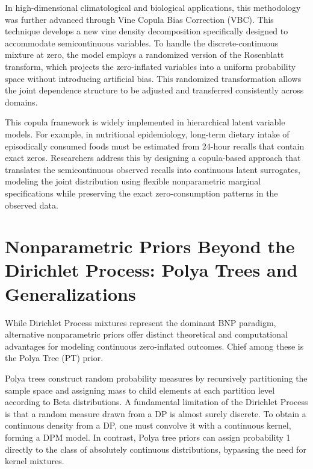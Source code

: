 \documentclass[11pt, a4paper]{article}
\begin{document}
In high-dimensional climatological and biological applications, this methodology was further advanced through Vine Copula Bias Correction (VBC).\cite{schepsmeier2016} This technique develops a new vine density decomposition specifically designed to accommodate semicontinuous variables.\cite{schepsmeier2016} To handle the discrete-continuous mixture at zero, the model employs a randomized version of the Rosenblatt transform, which projects the zero-inflated variables into a uniform probability space without introducing artificial bias.\cite{schepsmeier2016} This randomized transformation allows the joint dependence structure to be adjusted and transferred consistently across domains.\cite{schepsmeier2016}

This copula framework is widely implemented in hierarchical latent variable models.\cite{tooze2006} For example, in nutritional epidemiology, long-term dietary intake of episodically consumed foods must be estimated from 24-hour recalls that contain exact zeros.\cite{tooze2006} Researchers address this by designing a copula-based approach that translates the semicontinuous observed recalls into continuous latent surrogates, modeling the joint distribution using flexible nonparametric marginal specifications while preserving the exact zero-consumption patterns in the observed data.\cite{tooze2006}


\section{Nonparametric Priors Beyond the Dirichlet Process: Polya Trees and Generalizations}

While Dirichlet Process mixtures represent the dominant BNP paradigm, alternative nonparametric priors offer distinct theoretical and computational advantages for modeling continuous zero-inflated outcomes.\cite{miller2018, barrientos2012, lavine1992} Chief among these is the Polya Tree (PT) prior.\cite{lavine1992} 

Polya trees construct random probability measures by recursively partitioning the sample space and assigning mass to child elements at each partition level according to Beta distributions.\cite{lavine1992} A fundamental limitation of the Dirichlet Process is that a random measure drawn from a DP is almost surely discrete.\cite{lavine1992} To obtain a continuous density from a DP, one must convolve it with a continuous kernel, forming a DPM model.\cite{lavine1992} In contrast, Polya tree priors can assign probability 1 directly to the class of absolutely continuous distributions, bypassing the need for kernel mixtures.\cite{egozcue2003}
\end{document}
